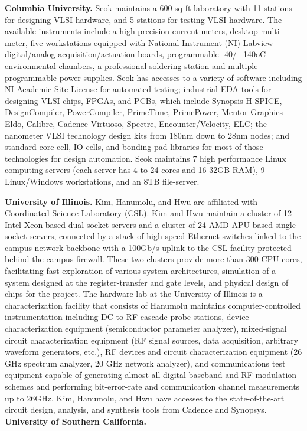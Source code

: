 \noindent
\textbf{Columbia University.} 
Seok maintains a 600 sq-ft laboratory with 11 stations for designing VLSI hardware, and 5 stations for testing VLSI hardware. 
The available instruments include a high-precision current-meters, desktop multi-meter, five workstations equipped with National Instrument (NI) Labview digital/analog acquisition/actuation boards, programmable -40/+140oC environmental chambers, a professional soldering station and multiple programmable power supplies. 
Seok has accesses to a variety of software including NI Academic Site License for automated testing; industrial EDA tools for designing VLSI chips, FPGAs, and PCBs, which include Synopsis H-SPICE, DesignCompiler, PowerCompiler, PrimeTime, PrimePower, Mentor-Graphics Eldo, Calibre, Cadence Virtuoso, Spectre, Encounter/Velocity, ELC; the nanometer VLSI technology design kits from 180nm down to 28nm nodes; and standard core cell, IO cells, and bonding pad libraries for most of those technologies for design automation. 
Seok maintains 7 high performance Linux computing servers (each server has 4 to 24 cores and 16-32GB RAM), 9 Linux/Windows workstations, and an 8TB file-server. 

\vspace{3pt}
\noindent
\textbf{University of Illinois.}
Kim, Hanumolu, and Hwu are affiliated with Coordinated Science Laboratory (CSL). 
Kim and Hwu maintain a cluster of 12 Intel Xeon-based dual-socket servers and a cluster of 24 AMD APU-based single-socket servers, 
connected by a stack of high-speed Ethernet switches linked to the campus network backbone with a 100Gb/s uplink to the CSL facility protected behind the campus firewall.
These two clusters provide more than 300 CPU cores, facilitating fast exploration of various system architectures, simulation of a system designed at the register-transfer and gate levels, and physical design of chips for the project.
The hardware lab at the University of Illinois is a characterization facility that consists of 
Hanumolu maintains computer-controlled instrumentation including DC to RF cascade probe stations, device characterization equipment (semiconductor parameter analyzer), 
mixed-signal circuit characterization equipment (RF signal sources, data acquisition, arbitrary waveform generators, etc.), RF devices and circuit characterization equipment (26 GHz spectrum analyzer, 20 GHz network analyzer), and communications test equipment capable of generating almost all digital baseband and RF modulation schemes and performing bit-error-rate and communication channel measurements up to 26GHz. 
Kim, Hanumolu, and Hwu have accesses to the state-of-the-art circuit design, analysis, and synthesis tools from Cadence and Synopsys.
\vspace{3pt}
\noindent
\textbf{University of Southern California.}
